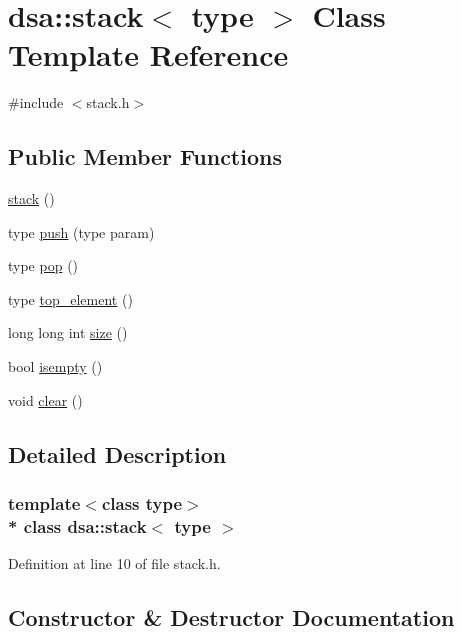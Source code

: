 \hypertarget{classdsa_1_1stack}{}\section{dsa\+:\+:stack$<$ type $>$ Class Template Reference}
\label{classdsa_1_1stack}


{\ttfamily \#include $<$stack.\+h$>$}

\subsection*{Public Member Functions}
\begin{DoxyCompactItemize}
\item 
\hyperlink{classdsa_1_1stack_a71b20aa52f9df074586486a17608a0f5}{stack} ()
\item 
type \hyperlink{classdsa_1_1stack_ac76dca47083750ded2273dbc9d9e234f}{push} (type param)
\item 
type \hyperlink{classdsa_1_1stack_a737bae803d75d77e314835ade9f3a16b}{pop} ()
\item 
type \hyperlink{classdsa_1_1stack_a2fb58198b837d533bffc2b14fa8e9f3f}{top\+\_\+element} ()
\item 
long long int \hyperlink{classdsa_1_1stack_a3f9900d00d38e0f71183b434943decc3}{size} ()
\item 
bool \hyperlink{classdsa_1_1stack_a31c480bd1b7107601afb69be8de966ba}{isempty} ()
\item 
void \hyperlink{classdsa_1_1stack_a22c068dac6bdbdf0f0f3767226d7519f}{clear} ()
\end{DoxyCompactItemize}


\subsection{Detailed Description}
\subsubsection*{template$<$class type$>$\\*
class dsa\+::stack$<$ type $>$}



Definition at line 10 of file stack.\+h.



\subsection{Constructor \& Destructor Documentation}
